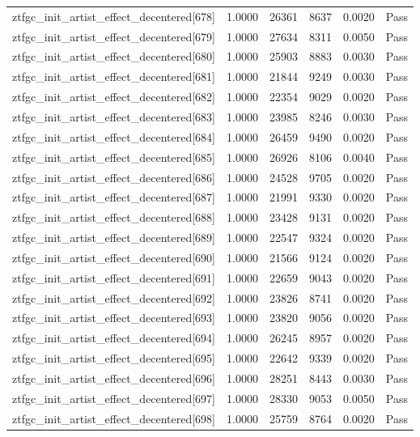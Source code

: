 \begin{table}[htbp]
\begin{tabular}{llrrll}
ztfgc\_init\_artist\_effect\_decentered[678] & 1.0000 & 26361 & 8637 & 0.0020 & Pass \\
ztfgc\_init\_artist\_effect\_decentered[679] & 1.0000 & 27634 & 8311 & 0.0050 & Pass \\
ztfgc\_init\_artist\_effect\_decentered[680] & 1.0000 & 25903 & 8883 & 0.0030 & Pass \\
ztfgc\_init\_artist\_effect\_decentered[681] & 1.0000 & 21844 & 9249 & 0.0030 & Pass \\
ztfgc\_init\_artist\_effect\_decentered[682] & 1.0000 & 22354 & 9029 & 0.0020 & Pass \\
ztfgc\_init\_artist\_effect\_decentered[683] & 1.0000 & 23985 & 8246 & 0.0030 & Pass \\
ztfgc\_init\_artist\_effect\_decentered[684] & 1.0000 & 26459 & 9490 & 0.0020 & Pass \\
ztfgc\_init\_artist\_effect\_decentered[685] & 1.0000 & 26926 & 8106 & 0.0040 & Pass \\
ztfgc\_init\_artist\_effect\_decentered[686] & 1.0000 & 24528 & 9705 & 0.0020 & Pass \\
ztfgc\_init\_artist\_effect\_decentered[687] & 1.0000 & 21991 & 9330 & 0.0020 & Pass \\
ztfgc\_init\_artist\_effect\_decentered[688] & 1.0000 & 23428 & 9131 & 0.0020 & Pass \\
ztfgc\_init\_artist\_effect\_decentered[689] & 1.0000 & 22547 & 9324 & 0.0020 & Pass \\
ztfgc\_init\_artist\_effect\_decentered[690] & 1.0000 & 21566 & 9124 & 0.0020 & Pass \\
ztfgc\_init\_artist\_effect\_decentered[691] & 1.0000 & 22659 & 9043 & 0.0020 & Pass \\
ztfgc\_init\_artist\_effect\_decentered[692] & 1.0000 & 23826 & 8741 & 0.0020 & Pass \\
ztfgc\_init\_artist\_effect\_decentered[693] & 1.0000 & 23820 & 9056 & 0.0020 & Pass \\
ztfgc\_init\_artist\_effect\_decentered[694] & 1.0000 & 26245 & 8957 & 0.0020 & Pass \\
ztfgc\_init\_artist\_effect\_decentered[695] & 1.0000 & 22642 & 9339 & 0.0020 & Pass \\
ztfgc\_init\_artist\_effect\_decentered[696] & 1.0000 & 28251 & 8443 & 0.0030 & Pass \\
ztfgc\_init\_artist\_effect\_decentered[697] & 1.0000 & 28330 & 9053 & 0.0050 & Pass \\
ztfgc\_init\_artist\_effect\_decentered[698] & 1.0000 & 25759 & 8764 & 0.0020 & Pass \\

\end{tabular}
\end{table}
